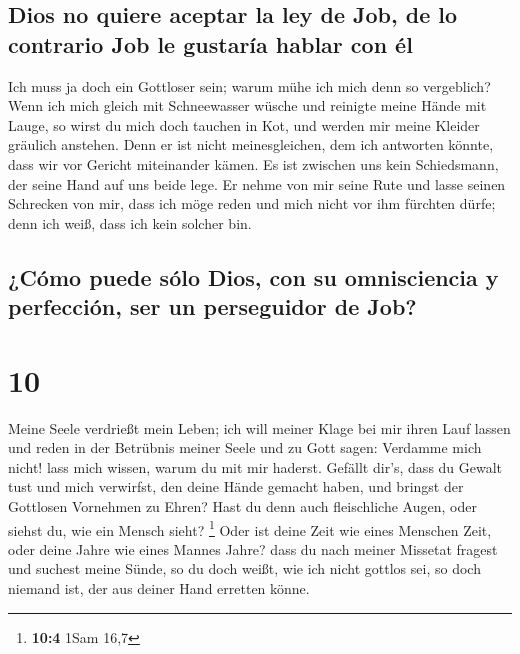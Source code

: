 \hypertarget{dios-no-quiere-aceptar-la-ley-de-job-de-lo-contrario-job-le-gustaruxeda-hablar-con-uxe9l}{%
\subsection{Dios no quiere aceptar la ley de Job, de lo contrario Job le
gustaría hablar con
él}\label{dios-no-quiere-aceptar-la-ley-de-job-de-lo-contrario-job-le-gustaruxeda-hablar-con-uxe9l}}

 Ich muss ja doch ein Gottloser sein; warum mühe ich mich
denn so vergeblich?  Wenn ich mich gleich mit
Schneewasser wüsche und reinigte meine Hände mit Lauge, 
so wirst du mich doch tauchen in Kot, und werden mir meine Kleider
gräulich anstehen.  Denn er ist nicht meinesgleichen, dem
ich antworten könnte, dass wir vor Gericht miteinander kämen.
 Es ist zwischen uns kein Schiedsmann, der seine Hand auf
uns beide lege.  Er nehme von mir seine Rute und lasse
seinen Schrecken von mir,  dass ich möge reden und mich
nicht vor ihm fürchten dürfe; denn ich weiß, dass ich kein solcher bin.

\hypertarget{cuxf3mo-puede-suxf3lo-dios-con-su-omnisciencia-y-perfecciuxf3n-ser-un-perseguidor-de-job}{%
\subsection{¿Cómo puede sólo Dios, con su omnisciencia y perfección, ser
un perseguidor de
Job?}\label{cuxf3mo-puede-suxf3lo-dios-con-su-omnisciencia-y-perfecciuxf3n-ser-un-perseguidor-de-job}}

\hypertarget{section-9}{%
\section{10}\label{section-9}}

 Meine Seele verdrießt mein Leben; ich will meiner Klage
bei mir ihren Lauf lassen und reden in der Betrübnis meiner Seele
 und zu Gott sagen: Verdamme mich nicht! lass mich wissen,
warum du mit mir haderst.  Gefällt dir's, dass du Gewalt
tust und mich verwirfst, den deine Hände gemacht haben, und bringst der
Gottlosen Vornehmen zu Ehren?  Hast du denn auch
fleischliche Augen, oder siehst du, wie ein Mensch sieht? \footnote{\textbf{10:4}
  1Sam 16,7}  Oder ist deine Zeit wie eines Menschen Zeit,
oder deine Jahre wie eines Mannes Jahre?  dass du nach
meiner Missetat fragest und suchest meine Sünde,  so du
doch weißt, wie ich nicht gottlos sei, so doch niemand ist, der aus
deiner Hand erretten könne.

